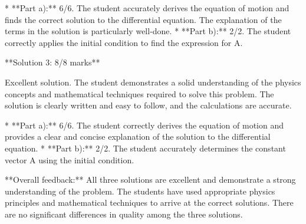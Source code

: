 \documentclass[a4paper,11pt]{article}
\begin{document}
*   **Part a):** 6/6. The student accurately derives the equation of motion and finds the correct solution to the differential equation. The explanation of the terms in the solution is particularly well-done.
*   **Part b):** 2/2. The student correctly applies the initial condition to find the expression for A.

**Solution 3: 8/8 marks**

Excellent solution. The student demonstrates a solid understanding of the physics concepts and mathematical techniques required to solve this problem. The solution is clearly written and easy to follow, and the calculations are accurate.

*   **Part a):** 6/6. The student correctly derives the equation of motion and provides a clear and concise explanation of the solution to the differential equation.
*   **Part b):** 2/2. The student accurately determines the constant vector A using the initial condition.

**Overall feedback:** All three solutions are excellent and demonstrate a strong understanding of the problem. The students have used appropriate physics principles and mathematical techniques to arrive at the correct solutions. There are no significant differences in quality among the three solutions.
\end{document}
